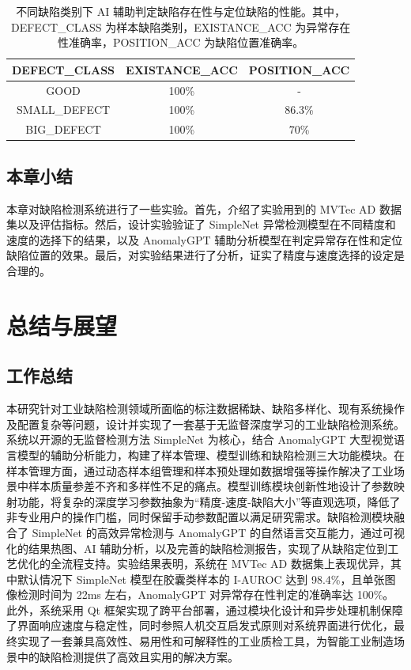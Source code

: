 \documentclass[
  ]{njuthesis}
\begin{document}
\begin{table}[H]
    \centering
    \caption{不同缺陷类别下 AI 辅助判定缺陷存在性与定位缺陷的性能。其中，DEFECT\_CLASS 为样本缺陷类别，EXISTANCE\_ACC 为异常存在性准确率，POSITION\_ACC 为缺陷位置准确率。}
    \label{AI_detection_accuracy}
    \renewcommand\arraystretch{0.5}
    \begin{tabular}{c|c|c}
    \toprule[1.5pt]
    DEFECT\_CLASS & EXISTANCE\_ACC & POSITION\_ACC \\
    \midrule[1pt]
    GOOD & 100\% & - \\
    \midrule[0.5pt]
    SMALL\_DEFECT & 100\% & 86.3\% \\
    \midrule[0.5pt]
    BIG\_DEFECT & 100\% & 70\% \\
    \bottomrule[1.5pt]
    \end{tabular}
\end{table}

\section{本章小结}

本章对缺陷检测系统进行了一些实验。首先，介绍了实验用到的 MVTec AD 数据集以及评估指标。然后，设计实验验证了 SimpleNet 异常检测模型在不同精度和速度的选择下的结果，以及 AnomalyGPT 辅助分析模型在判定异常存在性和定位缺陷位置的效果。最后，对实验结果进行了分析，证实了精度与速度选择的设定是合理的。

\chapter{总结与展望}

\section{工作总结}

本研究针对工业缺陷检测领域所面临的标注数据稀缺、缺陷多样化、现有系统操作及配置复杂等问题，设计并实现了一套基于无监督深度学习的工业缺陷检测系统。系统以开源的无监督检测方法 SimpleNet 为核心，结合 AnomalyGPT 大型视觉语言模型的辅助分析能力，构建了样本管理、模型训练和缺陷检测三大功能模块。在样本管理方面，通过动态样本组管理和样本预处理如数据增强等操作解决了工业场景中样本质量参差不齐和多样性不足的痛点。模型训练模块创新性地设计了参数映射功能，将复杂的深度学习参数抽象为“精度-速度-缺陷大小”等直观选项，降低了非专业用户的操作门槛，同时保留手动参数配置以满足研究需求。缺陷检测模块融合了 SimpleNet 的高效异常检测与 AnomalyGPT 的自然语言交互能力，通过可视化的结果热图、AI 辅助分析，以及完善的缺陷检测报告，实现了从缺陷定位到工艺优化的全流程支持。实验结果表明，系统在 MVTec AD 数据集上表现优异，其中默认情况下 SimpleNet 模型在胶囊类样本的 I-AUROC 达到 98.4\%，且单张图像检测时间为 22ms 左右，AnomalyGPT 对异常存在性判定的准确率达 100\%。此外，系统采用 Qt 框架实现了跨平台部署，通过模块化设计和异步处理机制保障了界面响应速度与稳定性，同时参照人机交互启发式原则对系统界面进行优化，最终实现了一套兼具高效性、易用性和可解释性的工业质检工具，为智能工业制造场景中的缺陷检测提供了高效且实用的解决方案。
\end{document}

